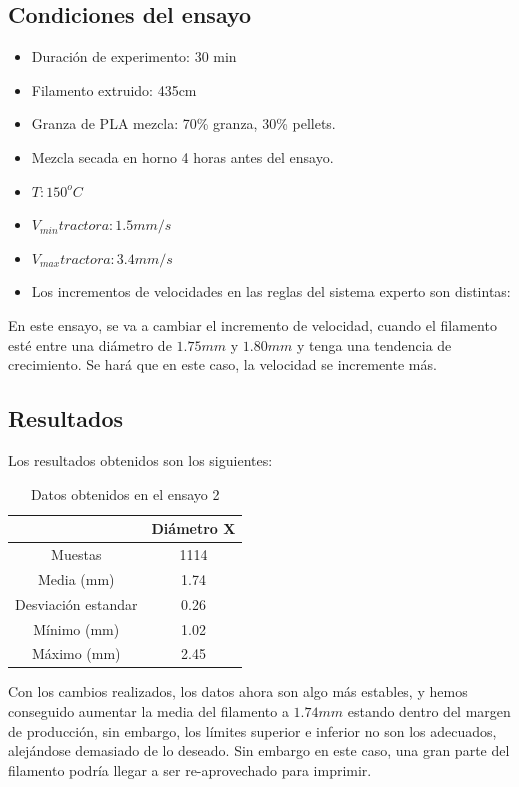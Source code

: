 \subsection{Condiciones del ensayo}

\begin{itemize}
	\item{Duración de experimento: 30 min}
	\item{Filamento extruido: 435cm}
	\item{Granza de PLA mezcla: 70\% granza, 30\% pellets.}
	\item{Mezcla secada en horno 4 horas antes del ensayo.}
	\item{$T: 150^oC$}
	\item{$V_{min} tractora: 1.5 mm/s$}
	\item{$V_{max} tractora: 3.4 mm/s$}
	\item{Los incrementos de velocidades en las reglas del sistema experto son distintas:}
\end{itemize}

En este ensayo, se va a cambiar el incremento de velocidad, cuando el filamento esté entre una diámetro de $1.75 mm$ y $1.80 mm$ y tenga una tendencia de crecimiento. Se hará que en este caso, la velocidad se incremente más.

\subsection{Resultados}
Los resultados obtenidos son los siguientes:

\begin{table}[H]
	\centering
	\begin{tabular}{cc}
		                    & Diámetro X \\ \hline
		Muestas             & 1114      \\
		Media (mm)          & 1.74       \\
		Desviación estandar & 0.26       \\
		Mínimo (mm)         & 1.02       \\
		Máximo (mm)         & 2.45      
	\end{tabular}
	\caption{Datos obtenidos en el ensayo 2}
	\label{tab:resl_ens2}
\end{table}

Con los cambios realizados, los datos ahora son algo más estables, y hemos conseguido aumentar la media del filamento a $1.74 mm$ estando dentro del margen de producción, sin embargo, los límites superior e inferior no son los adecuados, alejándose demasiado de lo deseado. Sin embargo en este caso, una gran parte del filamento podría llegar a ser re-aprovechado para imprimir.

